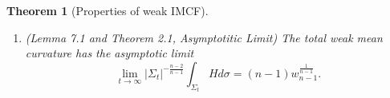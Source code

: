 \documentclass[12pt]{amsart}
\newtheorem{theorem}{Theorem}[section]
\theoremstyle{definition}
\numberwithin{equation}{section}
\begin{document}
\begin{theorem}[Properties of weak IMCF]
\begin{enumerate}[label= (\roman*)]
    \begin{equation} \label{eccen}
        ce^{\frac{t}{n-1}} \leq \min_{\Sigma_{t}} |x| \leq \max_{\Sigma_{t}} |x| \leq Ce^{\frac{t}{n-1}}
    \end{equation}
    in asymptotically flat coordinates $(x^{1},\dots,x^{n})$ of $(M^{n} \setminus K,g)$. 
    \item (Lemma 7.1 and Theorem 2.1, Asymptotitic Limit) The total weak mean curvature has the asymptotic limit
    \begin{equation} \label{total_mc}
        \lim_{t \rightarrow \infty} |\Sigma_{t}|^{-\frac{n-2}{n-1}} \int_{\Sigma_{t}} H d\sigma = (n-1)w_{n-1}^{\frac{1}{n-1}}.
    \end{equation}
\end{enumerate}
\end{theorem}
\end{document}
